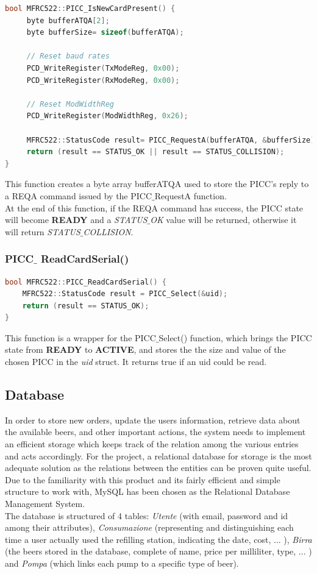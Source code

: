 \documentclass[target=bach,aauheader=,style=]{thud}
\begin{document}
\begin{lstlisting}[language=C++,style=cpp,caption={PICC$\_$ IsNewCardPresent().}]
bool MFRC522::PICC_IsNewCardPresent() {
	 byte bufferATQA[2];
	 byte bufferSize= sizeof(bufferATQA);
	
	 // Reset baud rates
	 PCD_WriteRegister(TxModeReg, 0x00);
	 PCD_WriteRegister(RxModeReg, 0x00);
 	
 	 // Reset ModWidthReg
	 PCD_WriteRegister(ModWidthReg, 0x26);
	
	 MFRC522::StatusCode result= PICC_RequestA(bufferATQA, &bufferSize);
	 return (result == STATUS_OK || result == STATUS_COLLISION);
} 
\end{lstlisting}
This function creates a byte array bufferATQA used to store the PICC's reply to a REQA command issued by the PICC$\_$RequestA function.\\
At the end of this function, if the REQA command has success, the PICC state will become \textbf{READY} and a \emph{STATUS$\_$OK} value will be returned, otherwise it will return \emph{STATUS$\_$COLLISION}.

\subsubsection{PICC$\_$ ReadCardSerial()}

\begin{lstlisting}[language=c++,style=cpp,caption={PICC$\_$ReadCardSerial().}]
bool MFRC522::PICC_ReadCardSerial() {
	MFRC522::StatusCode result = PICC_Select(&uid);
	return (result == STATUS_OK);
} 
\end{lstlisting}
This function is a wrapper for the PICC$\_$Select() function, which brings the PICC state from \textbf{READY} to \textbf{ACTIVE}, and stores the the size and value of the chosen PICC in the \emph{uid} struct.
It returns true if an uid could be read.


\newpage
\subsection{Database}

In order to store new orders, update the users information, retrieve data about the available beers, and other important actions, the system needs to implement an efficient storage which keeps track of the relation among the various entries and acts accordingly. For the project, a relational database for storage is the most adequate solution as the relations between the entities can be proven quite useful. Due to the familiarity with this product and its fairly efficient and simple structure to work with, MySQL has been chosen as the Relational Database Management System.
\\
The database is structured of 4 tables: \emph{Utente} (with email, password and id among their attributes), \emph{Consumazione} (representing and distinguishing each time a user actually used the refilling station, indicating the date, cost, ... ), \emph{Birra} (the beers stored in the database, complete of  name, price per milliliter, type, ... ) and \emph{Pompa} (which links each pump to a specific type of beer).
\end{document}
